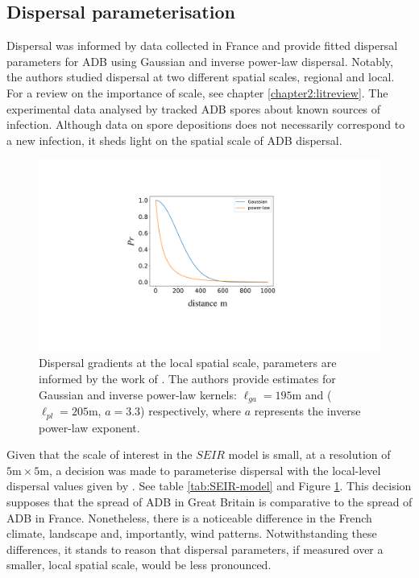 % 

 
\subsection{Dispersal parameterisation}

Dispersal was informed by data collected in France \cite{grosdidier2018tracking} and provide fitted dispersal parameters for ADB using Gaussian and inverse power-law dispersal. Notably, the authors studied dispersal at two different spatial scales, regional and local. For a review on the importance of scale, see chapter \ref{chapter2:litreview}. The experimental data analysed by \cite{grosdidier2018tracking} tracked ADB spores about known sources of infection. Although data on spore depositions does not necessarily correspond to a new infection, it sheds light on the spatial scale of ADB dispersal. 
\begin{figure}
    \centering
    \includegraphics[scale=0.25]{chapter6/figures/fig2.pdf}
    \caption{Dispersal gradients at the local spatial scale, parameters are informed by the work of \cite{grosdidier2018tracking}. The authors provide estimates for Gaussian and inverse power-law kernels: $\ell_{ga} = 195\mathrm{m}$ and ($\ell_{pl} = 205\mathrm{m}$, $a=3.3$) respectively, where $a$ represents the inverse power-law exponent.}
    \label{fig:dispersal-parameterisation}
\end{figure}

Given that the scale of interest in the $SEIR$ model is small, at a  resolution of $5\mathrm{m} \times 5\mathrm{m}$, a decision was made to parameterise dispersal with the local-level dispersal values given by \cite{grosdidier2018tracking}. See table \ref{tab:SEIR-model} and Figure \ref{fig:dispersal-parameterisation}. This decision supposes that the spread of ADB in Great Britain is comparative to the spread of ADB in France. Nonetheless, there is a noticeable difference in the French climate, landscape and, importantly, wind patterns. %
Notwithstanding these differences, it stands to reason that dispersal parameters, if measured over a smaller, local spatial scale, would be less pronounced. 

